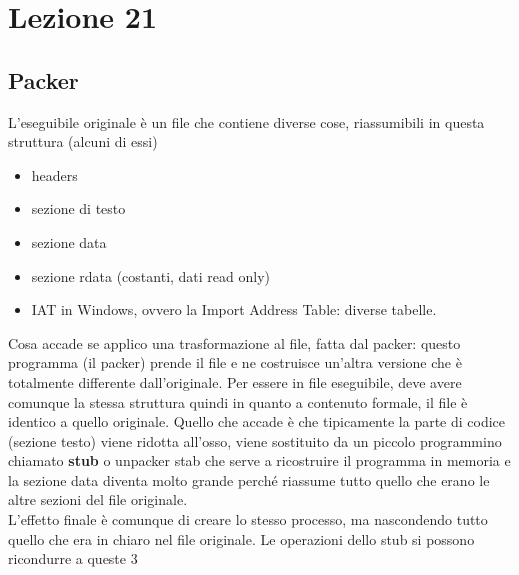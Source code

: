 \documentclass[12pt, oneside]{extbook}
\begin{document}
\chapter{Lezione 21}
\section{Packer}
L'eseguibile originale è un file che contiene diverse cose, riassumibili in questa struttura (alcuni di essi)
\begin{itemize}
\item headers
\item sezione di testo
\item sezione data
\item sezione rdata (costanti, dati read only)
\item IAT in Windows, ovvero la Import Address Table: diverse tabelle.
\end{itemize}
Cosa accade se applico una trasformazione al file, fatta dal packer: questo programma (il packer) prende il file e ne costruisce un'altra versione che è totalmente differente dall'originale. Per essere in file eseguibile, deve avere comunque la stessa struttura quindi in quanto a contenuto formale, il file è identico a quello originale. Quello che accade è che tipicamente la parte di codice (sezione testo) viene ridotta all'osso, viene sostituito da un piccolo programmino chiamato \textbf{stub} o unpacker stab che serve a ricostruire il programma in memoria e la sezione data diventa molto grande perché riassume tutto quello che erano le altre sezioni del file originale.\\L'effetto finale è comunque di creare lo stesso processo, ma nascondendo tutto quello che era in chiaro nel file originale. Le operazioni dello stub si possono ricondurre a queste 3
\end{document}
